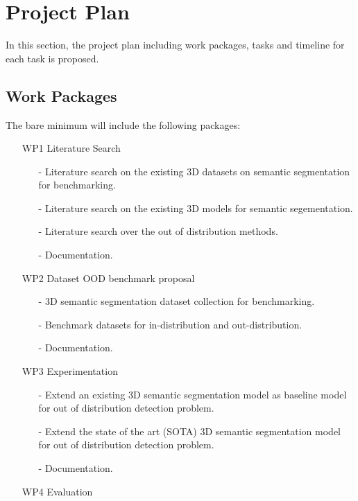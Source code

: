 \documentclass[thesis]{mas_proposal}
\begin{document}
\section{Project Plan}
In this section, the project plan including work packages, tasks and timeline for each task is proposed.
\subsection{Work Packages}
The bare minimum will include the following packages:
\begin{enumerate}
    \item[WP1] Literature Search
    \begin{itemize}
        \item[-] Literature search on the existing 3D datasets on semantic segmentation for benchmarking.
        \item[-] Literature search on the existing  3D models for semantic segementation.
        \item[-] Literature search over the out of distribution methods.
        \item[-] Documentation.
    \end{itemize} 
    \item[WP2] Dataset OOD benchmark proposal
    \begin{itemize}
        \item[-] 3D semantic segmentation dataset collection for benchmarking.
        \item[-] Benchmark datasets for in-distribution and out-distribution.
        \item[-] Documentation.
    \end{itemize}
    \item[WP3] Experimentation
    \begin{itemize}
        \item[-] Extend an existing 3D semantic segmentation model as baseline model for out of distribution detection problem.
        \item[-] Extend the state of the art (SOTA) 3D semantic segmentation model for out of distribution detection problem.
        \item[-] Documentation. 
    \end{itemize}
    \item[WP4] Evaluation
    \begin{itemize}

\end{itemize}
\end{enumerate}
\end{document}
